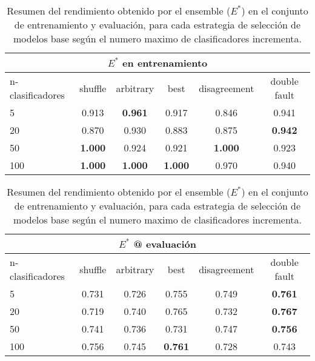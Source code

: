 \begin{table}[!htb]
    \centering
    
    \begin{tabular}{lccccc}
    \toprule
        \multicolumn{6}{c}{$E^*$ en entrenamiento} \\ \midrule
        n-clasificadores & shuffle & arbitrary & best & disagreement & double fault  \\ \midrule \midrule
        5 & 0.913 & {\bf 0.961} & 0.917 & 0.846 & 0.941 \\
        20 & 0.870 & 0.930 & 0.883 & 0.875 & {\bf 0.942} \\
        50 & {\bf 1.000} & 0.924 & 0.921 & {\bf 1.000} & 0.923 \\
        100 & {\bf 1.000} & {\bf 1.000} & {\bf 1.000} & 0.970 & 0.940 \\
    \bottomrule
    \end{tabular}

    \begin{tabular}{lccccc}
    \toprule
        \multicolumn{6}{c}{$E^*$ @ evaluación} \\ \midrule
        n-clasificadores & shuffle & arbitrary & best & disagreement & double fault  \\ \midrule \midrule
        5 & 0.731 & 0.726 & 0.755 & 0.749 & {\bf 0.761} \\
        20 & 0.719 & 0.740 & 0.765 & 0.732 & {\bf 0.767} \\
        50 & 0.741 & 0.736 & 0.731 & 0.747 & {\bf 0.756} \\
        100 & 0.756 & 0.745 & {\bf 0.761} & 0.728 & 0.743 \\
    \bottomrule
    \end{tabular}

    \caption{Resumen del rendimiento obtenido por el ensemble ($E^*$) en el conjunto de entrenamiento y evaluación, para cada estrategia de selección de modelos base según el numero maximo de clasificadores incrementa.}
    \label{table:performance}
\end{table}

